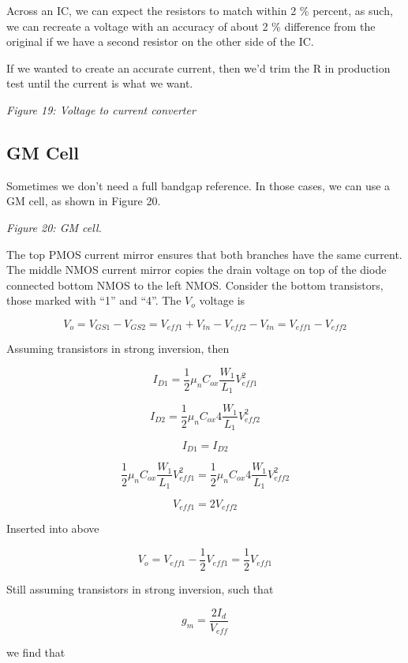 Across an IC, we can expect the resistors to match within 2 \% percent,
as such, we can recreate a voltage with an accuracy of about 2 \%
difference from the original if we have a second resistor on the other
side of the IC.

If we wanted to create an accurate current, then we'd trim the R in
production test until the current is what we want.


{
\centering
{}
}

\emph{Figure 19: Voltage to current converter}

\subsection{GM Cell}\label{gm-cell}

Sometimes we don't need a full bandgap reference. In those cases, we can
use a GM cell, as shown in Figure 20.


{
\centering
{}
}

\emph{Figure 20: GM cell. }

The top PMOS current mirror ensures that both branches have the same
current. The middle NMOS current mirror copies the drain voltage on top
of the diode connected bottom NMOS to the left NMOS. Consider the bottom
transistors, those marked with ``1'' and ``4''. The \(V_o\) voltage is

\[ V_o = V_{GS1}  - V_{GS2}  = V_{eff1} + V_{tn} - V_{eff2} - V_{tn} = V_{eff1} - V_{eff2}\]

Assuming transistors in strong inversion, then

\[ I_{D1} = \frac{1}{2} \mu_n C_{ox} \frac{W_1}{L_1} V_{eff1}^2 \]

\[ I_{D2} = \frac{1}{2} \mu_n C_{ox} 4 \frac{W_1}{L_1} V_{eff2}^2 \]

\[ I_{D1} = I_{D2} \]

\[ \frac{1}{2} \mu_n C_{ox} \frac{W_1}{L_1} V_{eff1}^2 = \frac{1}{2} \mu_n C_{ox} 4 \frac{W_1}{L_1} V_{eff2}^2 \]

\[ V_{eff1} = 2 V_{eff2} \]

Inserted into above

\[V_o = V_{eff1} - \frac{1}{2} V_{eff1} = \frac{1}{2}V_{eff1}\]

Still assuming transistors in strong inversion, such that

\[ g_{m} = \frac{2 I_d}{V_{eff}} \]

we find that

